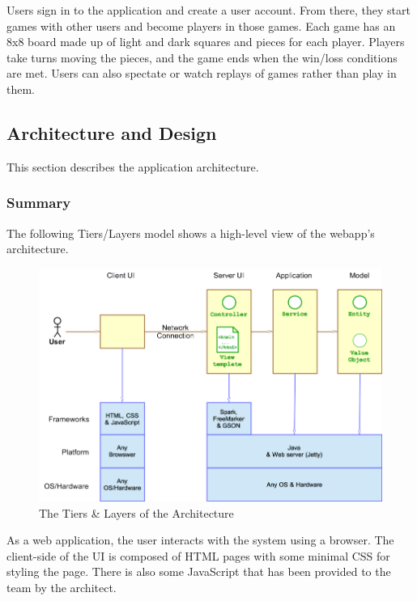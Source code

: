 \documentclass[]{article}
\begin{document}
Users sign in to the application and create a user account. From there,
they start games with other users and become players in those games.
Each game has an 8x8 board made up of light and dark squares and pieces
for each player. Players take turns moving the pieces, and the game ends
when the win/loss conditions are met. Users can also spectate or watch
replays of games rather than play in them.

\hypertarget{architecture-and-design}{%
\subsection{Architecture and Design}\label{architecture-and-design}}

This section describes the application architecture.

\hypertarget{summary}{%
\subsubsection{Summary}\label{summary}}

The following Tiers/Layers model shows a high-level view of the webapp's
architecture.

\begin{figure}
\centering
\includegraphics{./tex2pdf.1500/8585463a61d25b331ef215353ef264fe54be55e6.png}
\caption{The Tiers \& Layers of the Architecture}
\end{figure}

As a web application, the user interacts with the system using a
browser. The client-side of the UI is composed of HTML pages with some
minimal CSS for styling the page. There is also some JavaScript that has
been provided to the team by the architect.
\end{document}

